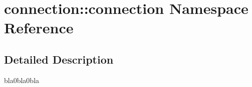 \hypertarget{namespaceconnection_1_1connection}{}\section{connection\+:\+:connection Namespace Reference}
\label{namespaceconnection_1_1connection}


\subsection{Detailed Description}
bla0bla0bla 